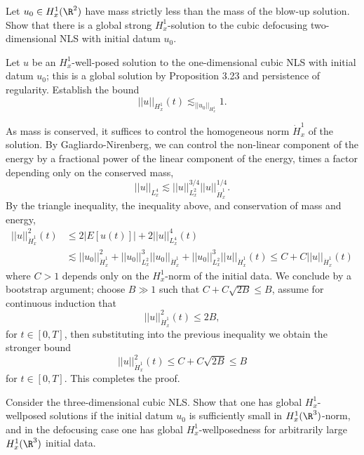 \begin{statement}
	Let $u_0 \in H^1_x (\R^2)$ have mass strictly less than the mass of the blow-up solution. Show that there is a global strong $H^1_x$-solution to the cubic defocusing two-dimensional NLS with initial datum $u_0$. 
\end{statement}

\begin{solution}

\end{solution}

\begin{statement}
	Let $u$ be an $H^1_x$-well-posed solution to the one-dimensional cubic NLS with initial datum $u_0$; this is a global solution by Proposition 3.23 and persistence of regularity. Establish the bound
		\[ ||u||_{H^1_x} (t) \lesssim_{||u_0||_{H^1_x}} 1. \]
\end{statement}

\begin{solution}
	As mass is conserved, it suffices to control the homogeneous norm $\dot H^1_x$ of the solution. By Gagliardo-Nirenberg, we can control the non-linear component of the energy by a fractional power of the linear component of the energy, times a factor depending only on the conserved mass, 
		\[ ||u||_{L^4_x} \lesssim ||u||_{L^2_x}^{3/4} ||u||_{\dot H^1_x}^{1/4}. \] 
	By the triangle inequality, the inequality above, and conservation of mass and energy, 
		\begin{align*}
			 || u||_{\dot H^1_x}^2 (t) 
			 	&\leq 2|E[u (t)]| + 2||u||_{L^4_x}^4 (t)\\
			 	& \lesssim ||u_0||_{\dot H^1_x}^2 + ||u_0||_{L^2_x}^3 ||u_0||_{\dot H^1_x} + ||u_0||_{L^2_x}^3 ||u||_{\dot H^1_x} (t)\leq C + C ||u||_{\dot H^1_x} (t)
		\end{align*}	 
	where $C > 1$ depends only on the	$H^1_x$-norm of the initial data. We conclude by a bootstrap argument; choose $B \gg 1$ such that $C + C\sqrt{2B} \leq B$, assume for continuous induction that
		\[ ||u||_{\dot H^1_x}^2 (t) \leq 2B, \]
	for $t \in [0, T]$, then substituting into the previous inequality we obtain the stronger bound
		\[ ||u||_{\dot H^1_x}^2 (t) \leq C + C \sqrt{2B} \leq B \]	
	for $t \in [0, T]$. This completes the proof. 
\end{solution}

\begin{statement}
	Consider the three-dimensional cubic NLS. Show that one has global $H^1_x$-wellposed solutions if the initial datum $u_0$ is sufficiently small in $H^1_x (\R^3)$-norm, and in the defocusing case one has global $H^1_x$-wellposedness for arbitrarily large $H^1_x (\R^3)$ initial data. 
\end{statement}

